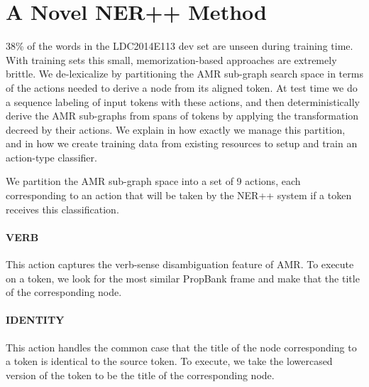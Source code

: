 \documentclass[11pt]{article}
\begin{document}


\section{A Novel NER++ Method}\label{sec:nerplusplus}
38\% of the words in the LDC2014E113 dev set are 
  unseen during training time. 
With training sets this small, memorization-based approaches are extremely brittle.
We de-lexicalize by partitioning the AMR sub-graph search space in terms of the actions needed to 
  derive a node from its aligned token. 
At test time we do a sequence labeling of input tokens with these actions, and 
  then deterministically derive the AMR sub-graphs from spans of tokens by applying 
  the transformation decreed by their actions. 
We explain in  how exactly we manage this partition, and in  how we create training data from existing resources to setup and train an action-type classifier.


We partition the AMR sub-graph space into a set of 9 actions, each corresponding to an action that will be taken by the NER++ system if a token receives this classification.

\paragraph{VERB} This action captures the verb-sense disambiguation feature of AMR. To execute on a token, we look for the most similar PropBank frame and make that the title of the corresponding node.

\paragraph{IDENTITY} This action handles the common case that the title of the node corresponding to a token is identical to the source token. To execute, we take the lowercased version of the token to be the title of the corresponding node.
\end{document}
